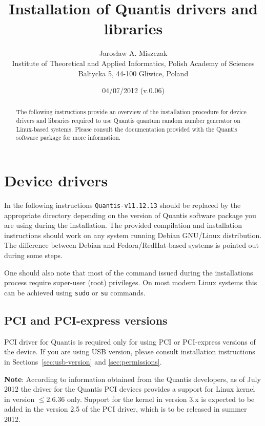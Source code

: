 \documentclass[a4paper,11pt]{article}
\title{Installation of Quantis drivers and libraries}
\author{Jaros{\l}aw A. Miszczak\\
Institute of Theoretical and Applied Informatics, Polish Academy of Sciences\\
Baltycka 5, 44-100 Gliwice, Poland}
\date{04/07/2012 (v.0.06)}
\providecommand{\note}[1]{\vspace{6pt}\noindent\textbf{Note}: #1\vspace{6pt}}
\newcommand{\QuantisDistVersion}{Quantis-v11.12.13}
\begin{document}
\maketitle

\begin{abstract}
The following instructions provide an overview of the installation procedure for
device drivers and libraries required to use Quantis quantum random number
generator on Linux-based systems. Please consult the documentation provided with
the Quantis software package for more information.
\end{abstract}

\section{Device drivers}
In the following instructions \texttt{\QuantisDistVersion } should be replaced
by the appropriate directory depending on the version of Quantis software
package you are using during the installation. The provided compilation and
installation instructions should work on any system running Debian GNU/Linux
distribution. The difference between Debian and Fedora/RedHat-based systems is
pointed out during some steps.

One should also note that most of the command issued during the installations
process require super-user (root) privileges. On most modern Linux systems
this can be achieved using \texttt{sudo} or \texttt{su} commands.

\subsection{PCI and PCI-express versions}
PCI driver for Quantis is required only for using PCI or PCI-express versions of
the device. If you are using USB version, please consult installation
instructions in Sections~\ref{sec:usb-version} and \ref{sec:permissions}.

\note{According to information obtained from the Quantis developers, as of July
2012 the driver for the Quantis PCI devices provides a support for Linux kernel
in version $\leq 2.6.36$ only. Support for the kernel in version 3.x is expected
to be added in the version 2.5 of the PCI driver, which is to be released in
summer 2012.}
\end{document}
